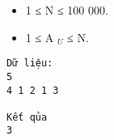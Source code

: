\begin{itemize}
	\item     1 ≤ N ≤ 100 000.   
	\item     1 ≤ A    $_     U    $    ≤ N.   
\end{itemize}
\begin{verbatim}
Dữ liệu:
5
4 1 2 1 3

Kết qủa
3
\end{verbatim}